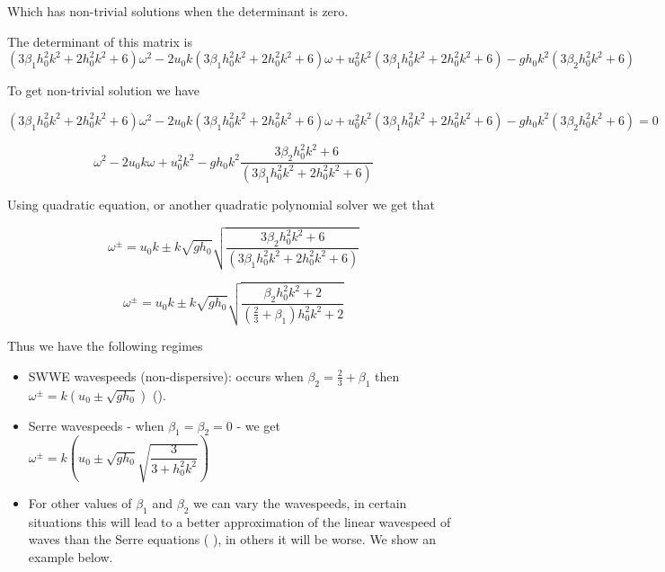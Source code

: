 \documentclass[10pt]{article}
\begin{document}
Which has non-trivial solutions when the determinant is zero. 

The determinant of this matrix is
\begin{equation}
\left(3\beta_1 h_0^2 k^2 + 2h_0^2 k^2 + 6\right)\omega^2 - 2 u_0k \left(3\beta_1 h_0^2 k^2 + 2h_0^2 k^2 + 6\right)\omega  + u_0^2 k^2 \left(3\beta_1 h_0^2 k^2 + 2h_0^2 k^2 + 6\right) - g h_0 k^2 \left(3 \beta_2 h_0^2 k^2 + 6\right)
\end{equation} 

To get non-trivial solution we have

\begin{equation}
\left(3\beta_1 h_0^2 k^2 + 2h_0^2 k^2 + 6\right)\omega^2 - 2 u_0k \left(3\beta_1 h_0^2 k^2 + 2h_0^2 k^2 + 6\right)\omega  + u_0^2 k^2 \left(3\beta_1 h_0^2 k^2 + 2h_0^2 k^2 + 6\right) - g h_0 k^2 \left(3 \beta_2 h_0^2 k^2 + 6\right) = 0
\end{equation} 

\begin{equation}
\omega^2 - 2 u_0k \omega  + u_0^2 k^2 - g h_0 k^2 \dfrac{3 \beta_2 h_0^2 k^2 + 6}{\left(3\beta_1 h_0^2 k^2 + 2h_0^2 k^2 + 6\right)} 
\end{equation} 

Using quadratic equation, or another quadratic polynomial solver we get that

\begin{equation}
\omega^\pm = u_0 k \pm k \sqrt{gh_0} \sqrt{\dfrac{3 \beta_2 h_0^2 k^2 + 6}{\left(3\beta_1 h_0^2 k^2 + 2h_0^2 k^2 + 6\right)} }
\end{equation}

\begin{equation}
\omega^\pm = u_0 k \pm k \sqrt{gh_0} \sqrt{\dfrac{\beta_2 h_0^2 k^2 + 2}{\left(\frac{2}{3} + \beta_1\right) h_0^2 k^2 + 2} }
\end{equation}


Thus we have the following regimes
\begin{itemize}
	\item SWWE wavespeeds (non-dispersive): occurs when $\beta_2 = \frac{2}{3} + \beta_1$ then $\omega^\pm = k\left(u_0\pm \sqrt{gh_0}\right)$ (\cite{Clamond-Dutykh-2018-237}).
	\item Serre wavespeeds - when $\beta_1 = \beta_2 = 0$ - we get $\omega^\pm = k\left(u_0\pm \sqrt{gh_0} \sqrt{\dfrac{3}{3 + h_0^2 k^2}}\right)$
	\item For other values of $\beta_1$ and $\beta_2$ we can vary the wavespeeds, in certain situations this will lead to a better approximation of the linear wavespeed of waves than the Serre equations ( \cite{Clamond-Dutykh-2018-237}), in others it will be worse. We show an example below.
\end{itemize}
\end{document}
